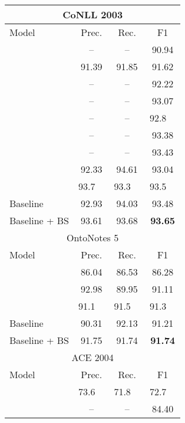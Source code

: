 \documentclass[11pt]{article}
\begin{document}
\begin{table}[!ht]
    \centering \small
    \begin{tabular}{lccc}
        \toprule
        \multicolumn{4}{c}{CoNLL 2003} \\
        \midrule
        Model & Prec. & Rec. & F1 \\
        \midrule
        \citet{lample-etal-2016-neural}     & -- & -- & 90.94 \\
        \citet{chiu-nichols-2016-named} & 91.39 & 91.85 & 91.62 \\
        \citet{peters-etal-2018-deep}       & -- & -- & 92.22 \\
        \citet{akbik-etal-2018-contextual} & -- & -- & 93.07 \\
        \citet{devlin-etal-2019-bert}       & -- & -- & 92.8~~ \\
        \citet{strakova-etal-2019-neural} & -- & -- & 93.38 \\
        \citet{wang-etal-2019-crossweigh} & -- & -- & 93.43 \\
        \citet{li-etal-2020-unified}        & 92.33 & 94.61 & 93.04 \\
        \citet{yu-etal-2020-named} & 93.7~~ & 93.3~~ & 93.5~~ \\ 
        Baseline          & 92.93 & 94.03 & 93.48 \\
        Baseline + BS     & 93.61 & 93.68 & \textbf{93.65} \\
        \bottomrule
        \toprule
        \multicolumn{4}{c}{OntoNotes 5} \\
        \midrule
        Model & Prec. & Rec. & F1 \\
        \midrule
        \citet{chiu-nichols-2016-named} & 86.04 & 86.53 & 86.28 \\
        \citet{li-etal-2020-unified}    & 92.98 & 89.95 & 91.11 \\
        \citet{yu-etal-2020-named}      & 91.1~~ & 91.5~~ & 91.3~~ \\
        Baseline          & 90.31 & 92.13 & 91.21 \\
        Baseline + BS     & 91.75 & 91.74 & \textbf{91.74} \\
        \bottomrule
        \toprule
        \multicolumn{4}{c}{ACE 2004} \\
        \midrule
        Model & Prec. & Rec. & F1 \\
        \midrule
        \citet{katiyar-cardie-2018-nested}  & 73.6~~ & 71.8~~ & 72.7~~ \\
        \citet{strakova-etal-2019-neural} & -- & -- & 84.40 \\

\end{tabular}
\end{table}
\end{document}
